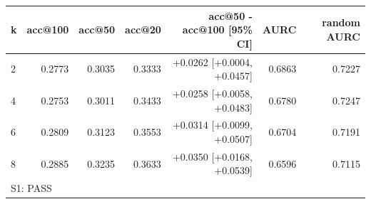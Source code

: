 \begin{tabular}{lrrrrrr}
\toprule
k & acc@100 & acc@50 & acc@20 & acc@50 - acc@100 [95\% CI] & AURC & random AURC \\
\midrule
2 & 0.2773 & 0.3035 & 0.3333 & +0.0262 [+0.0004, +0.0457] & 0.6863 & 0.7227 \\
4 & 0.2753 & 0.3011 & 0.3433 & +0.0258 [+0.0058, +0.0483] & 0.6780 & 0.7247 \\
6 & 0.2809 & 0.3123 & 0.3553 & +0.0314 [+0.0099, +0.0507] & 0.6704 & 0.7191 \\
8 & 0.2885 & 0.3235 & 0.3633 & +0.0350 [+0.0168, +0.0539] & 0.6596 & 0.7115 \\
\midrule
\multicolumn{7}{l}{S1: PASS} \\
\bottomrule
\end{tabular}
